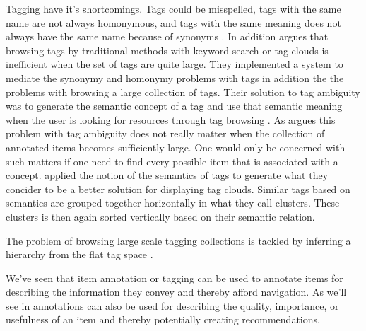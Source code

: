 Tagging have it's shortcomings. Tags could be misspelled, tags with the same
name are not always  homonymous, and tags with the same meaning does not
always have the same name because of synonyms \citep[]{aurnhammer06}. In
addition \citet[]{li07} argues that browsing tags by traditional
methods with keyword search or tag clouds is inefficient when the set of tags
are quite large. They implemented a system to mediate the synonymy and
homonymy problems with tags in addition the the problems with browsing a large
collection of tags. Their solution to tag ambiguity
was to generate the semantic concept%
of a tag and use that semantic meaning
when the user is looking for resources through tag browsing
\citep[]{li07}.
As \citet[]{weinberger07} argues this problem
with tag ambiguity does not really matter when the collection of annotated
items becomes sufficiently large. One would only be concerned with such
matters if one need to find every possible item that is associated with a
concept.
\citet[]{hassan06} applied the notion of the semantics of tags to
generate what they concider to be a better solution for displaying tag clouds.
Similar tags based on semantics are grouped together horizontally in what they
call clusters. These clusters is then again sorted vertically based on their
semantic relation.

The problem of browsing large scale tagging collections is tackled by
inferring a hierarchy%
from the flat tag space \citep[]{li07}.

We've seen that item annotation or tagging can be used to annotate items for
describing the information they convey and
thereby afford navigation. As we'll see in
annotations can also be used for describing the quality, importance, or
usefulness of an item and thereby potentially creating recommendations.

